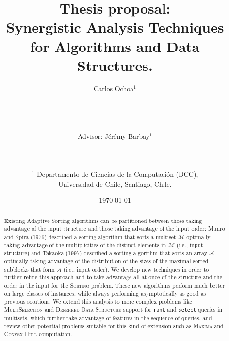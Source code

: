 \documentclass[10pt]{article}
\title{Thesis proposal: \\Synergistic Analysis Techniques\\ for Algorithms and Data Structures.}
\author{Carlos Ochoa$^{1}$
  \\\\\\\\\underline{\ \ \ \ \ \ \ \ \ \ \ \ \ \ \ \ \ \ \ \ \ \ \ \ \
    \ \ \ \ \ \ \ \ \ \ \ \ \ \ \ \ }
  \\Advisor: J\'er\'emy Barbay$^1$\\\\\\\\
  $^1$ Departamento de Ciencias de la Computaci\'on (DCC),\\ Universidad de Chile, Santiago, Chile.
}
\date{\today}
\begin{document}
\maketitle
\begin{abstract}
  Existing Adaptive Sorting algorithms can be partitioned between
  those taking advantage of the input structure and those taking
  advantage of the input order: Munro and Spira (1976) described a
  sorting algorithm that sorts a multiset $\mathcal{M}$ optimally
  taking advantage of the multiplicities of the distinct elements in
  $\mathcal{M}$ (i.e., input structure) and Takaoka (1997) described a
  sorting algorithm that sorts an array $\mathcal{A}$ optimally taking
  advantage of the distribution of the sizes of the maximal sorted
  subblocks that form $\mathcal{A}$ (i.e., input order). We develop
  new techniques in order to further refine this approach and to take
  advantage all at once of the structure and the order in the input
  for the \textsc{Sorting} problem. These new algorithms perform much
  better on large classes of instances, while always performing
  asymptotically as good as previous solutions. We extend this
  analysis to more complex problems like \textsc{MultiSelection} and
  \textsc{Deferred Data Structure} support for \texttt{rank} and
  \texttt{select} queries in multisets, which further take advantage of
  features in the sequence of queries, and review other potential
  problems suitable for this kind of extension such as \textsc{Maxima}
  and \textsc{Convex Hull} computation.
\end{abstract}
\clearpage





\end{document}
